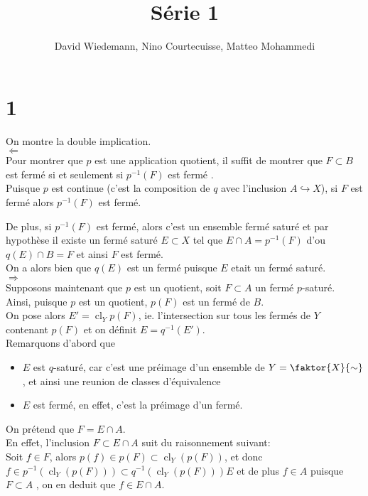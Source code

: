 \documentclass[11pt, a4paper]{article}
\DeclareMathOperator{\cl}{cl}
\begin{document}
\title{Série 1}
\author{David Wiedemann, Nino Courtecuisse, Matteo Mohammedi}
\maketitle
\section*{1}
On montre la double implication.\\

$\Longleftarrow$\\
Pour montrer que $p$ est une application quotient, il suffit de montrer que $F \subset B$ est fermé si et seulement si $p^{-1}( F) $ est fermé .\\
Puisque $p$ est continue (c'est la composition de $q$ avec l'inclusion $ A \hookrightarrow X$), si $F$ est fermé alors $p^{-1}( F) $ est fermé.

De plus, si $p^{-1}( F) $ est fermé, alors c'est un ensemble fermé saturé et par hypothèse il existe un fermé saturé $ E \subset X$ tel que $E\cap A = p^{-1}( F )$ d'ou $q( E) \cap B = F$ et ainsi $F$ est fermé.\\
On a alors bien que $q( E) $ est un fermé puisque $E$ etait un fermé saturé.\\

$\Longrightarrow$\\
Supposons maintenant que $p$ est un quotient, soit $ F \subset A$ un fermé $p$-saturé.\\
Ainsi, puisque $p$ est un quotient, $p(F) $ est un fermé de $ B$.\\
On pose alors $E' = \cl_Y p( F)  $, ie. l'intersection sur tous les fermés de $Y$ contenant $p( F) $  et on définit $ E= q^{-1}( E')$.\\
Remarquons d'abord que
\begin{itemize}
\item $E$ est $q$-saturé, car c'est une préimage d'un ensemble de $Y= \faktor{X}{\sim}$  , et ainsi une reunion de classes d'équivalence
\item $E$ est fermé, en effet, c'est la préimage d'un fermé.
\end{itemize}

On prétend que $F = E\cap A$.\\
En effet, l'inclusion $ F \subset E \cap A$ suit du raisonnement suivant:\\
Soit $f \in F$, alors $p( f) \in p( F) \subset \cl_Y( p( F) ) $, et donc $f\in p^{-1}( \cl_Y ( p( F) ) ) \subset q^{-1}( \cl_Y ( p( F) ) )E $ et de plus $f \in A$ puisque $F \subset A$ , on en deduit que $f\in E\cap A$.\\
\end{document}
